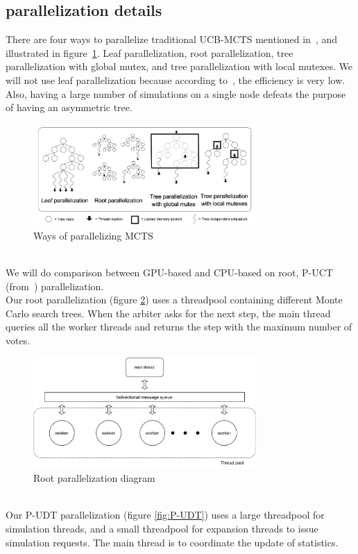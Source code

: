 \documentclass[sigconf]{acmart}
\begin{document}
\subsection{parallelization details}
There are four ways to parallelize traditional UCB-MCTS mentioned in~\cite{guillaumeMCTS}, and illustrated in figure~\ref{fig:mcts_parallel}. Leaf parallelization, root parallelization, tree parallelization with global mutex, and tree parallelization with local mutexes. We will not use leaf parallelization because according to~\cite{guillaumeMCTS}, the efficiency is very low. Also, having a large number of simulations on a single node defeats the purpose of having an asymmetric tree.
\begin{figure}[h]
  \includegraphics[width=8.5cm]{MCTS-parallel.png}
  \caption{Ways of parallelizing MCTS}
\label{fig:mcts_parallel}
\end{figure}\\
We will do comparison between GPU-based and CPU-based on root, P-UCT (from~\cite{Liu2020Watch}) parallelization. \\
Our root parallelization (figure \ref{fig:root_parallel}) uses a threadpool containing different Monte Carlo search trees. When the arbiter asks for the next step, the main thread queries all the worker threads and returns the step with the maximum number of votes. 
\begin{figure}[h]
  \includegraphics[width=8.5cm]{root-parallel.pdf}
  \caption{Root parallelization diagram}
\label{fig:root_parallel}
\end{figure}\\
Our P-UDT parallelization (figure \ref{fig:P-UDT}) uses a large threadpool for simulation threads, and a small threadpool for expansion threads to issue simulation requests. The main thread is to coordinate the update of statistics. 
\end{document}
